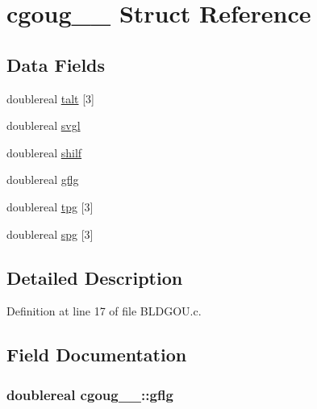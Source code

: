 \hypertarget{structcgoug__1__}{}\section{cgoug\+\_\+\_\+ Struct Reference}
\label{structcgoug__1__}
\subsection*{Data Fields}
\begin{DoxyCompactItemize}
\item 
doublereal \hyperlink{structcgoug__1___ade4fd3917e934e658236dd395739b876}{talt} \mbox{[}3\mbox{]}
\item 
doublereal \hyperlink{structcgoug__1___a323cc999ee5b3417fb2f7c9c83fea6e5}{svgl}
\item 
doublereal \hyperlink{structcgoug__1___a8bced007623caa3e4e02e315f5a100c8}{shilf}
\item 
doublereal \hyperlink{structcgoug__1___ad15a5baa87f0824bac2969fd284241b1}{gflg}
\item 
doublereal \hyperlink{structcgoug__1___a44680fe66ef7c1d7f4a7d210a24333e4}{tpg} \mbox{[}3\mbox{]}
\item 
doublereal \hyperlink{structcgoug__1___a9e8c5560b919a84675e6cb1cc1168f72}{spg} \mbox{[}3\mbox{]}
\end{DoxyCompactItemize}


\subsection{Detailed Description}


Definition at line 17 of file B\+L\+D\+G\+O\+U.\+c.



\subsection{Field Documentation}
\subsubsection[{\texorpdfstring{gflg}{gflg}}]{\setlength{\rightskip}{0pt plus 5cm}doublereal cgoug\+\_\+\_\+\+::gflg}\hypertarget{structcgoug__1___ad15a5baa87f0824bac2969fd284241b1}{}\label{structcgoug__1___ad15a5baa87f0824bac2969fd284241b1}


